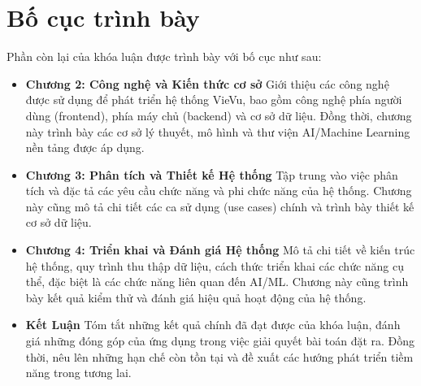 \section{Bố cục trình bày}
Phần còn lại của khóa luận được trình bày với bố cục như sau:
\begin{itemize}
    \item \textbf{Chương 2: Công nghệ và Kiến thức cơ sở}\nl
    Giới thiệu các công nghệ được sử dụng để phát triển hệ thống VieVu, bao gồm công nghệ phía người dùng (frontend), phía máy chủ (backend) và cơ sở dữ liệu. Đồng thời, chương này trình bày các cơ sở lý thuyết, mô hình và thư viện AI/Machine Learning nền tảng được áp dụng.

    \item \textbf{Chương 3: Phân tích và Thiết kế Hệ thống}\nl
    Tập trung vào việc phân tích và đặc tả các yêu cầu chức năng và phi chức năng của hệ thống. Chương này cũng mô tả chi tiết các ca sử dụng (use cases) chính và trình bày thiết kế cơ sở dữ liệu.

    \item \textbf{Chương 4: Triển khai và Đánh giá Hệ thống}\nl
    Mô tả chi tiết về kiến trúc hệ thống, quy trình thu thập dữ liệu, cách thức triển khai các chức năng cụ thể, đặc biệt là các chức năng liên quan đến AI/ML. Chương này cũng trình bày kết quả kiểm thử và đánh giá hiệu quả hoạt động của hệ thống.

    \item \textbf{Kết Luận}\nl
    Tóm tắt những kết quả chính đã đạt được của khóa luận, đánh giá những đóng góp của ứng dụng trong việc giải quyết bài toán đặt ra. Đồng thời, nêu lên những hạn chế còn tồn tại và đề xuất các hướng phát triển tiềm năng trong tương lai.
\end{itemize}